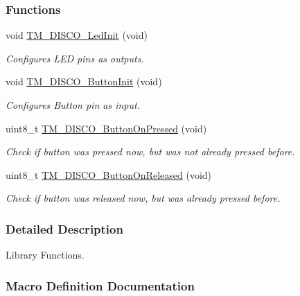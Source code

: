 \subsubsection*{Functions}
\begin{DoxyCompactItemize}
\item 
void \hyperlink{group___t_m___d_i_s_c_o___functions_ga14630e30f567396ddc945c577d762ee1}{T\+M\+\_\+\+D\+I\+S\+C\+O\+\_\+\+Led\+Init} (void)
\begin{DoxyCompactList}\small\item\em Configures L\+E\+D pins as outputs. \end{DoxyCompactList}\item 
void \hyperlink{group___t_m___d_i_s_c_o___functions_gabe5d286b45c36b96b3eb4df0e5b9cfde}{T\+M\+\_\+\+D\+I\+S\+C\+O\+\_\+\+Button\+Init} (void)
\begin{DoxyCompactList}\small\item\em Configures Button pin as input. \end{DoxyCompactList}\item 
uint8\+\_\+t \hyperlink{group___t_m___d_i_s_c_o___functions_ga24330bb47f3ed88ae841054a8023cd2a}{T\+M\+\_\+\+D\+I\+S\+C\+O\+\_\+\+Button\+On\+Pressed} (void)
\begin{DoxyCompactList}\small\item\em Check if button was pressed now, but was not already pressed before. \end{DoxyCompactList}\item 
uint8\+\_\+t \hyperlink{group___t_m___d_i_s_c_o___functions_ga3b6eee495f312c38eefaa90c40ccff5a}{T\+M\+\_\+\+D\+I\+S\+C\+O\+\_\+\+Button\+On\+Released} (void)
\begin{DoxyCompactList}\small\item\em Check if button was released now, but was already pressed before. \end{DoxyCompactList}\end{DoxyCompactItemize}


\subsubsection{Detailed Description}
Library Functions. 



\subsubsection{Macro Definition Documentation}
\hypertarget{group___t_m___d_i_s_c_o___functions_ga02c997906998f75a6cd676810022f9b3}{}
